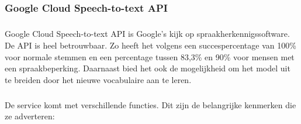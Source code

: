 \chapter{} \label{chap:Long list}%
\label{ch:long-list}

\section{}\label{sec:Speech recognition}%

\subsection{Google Cloud Speech-to-text API}%

\paragraph{}
Google Cloud Speech-to-text API is Google's kijk op spraakherkennigssoftware. De API is heel betrouwbaar. Zo heeft het volgens \textcite{Anggraini2018} een succespercentage van 100\% voor normale stemmen en een percentage tussen 83,3\% en 90\% voor mensen met een spraakbeperking. Daarnaast bied het ook de mogelijkheid om het model uit te breiden door het nieuwe vocabulaire aan te leren.

\paragraph{}
De service komt met verschillende functies. Dit zijn de belangrijke kenmerken die ze adverteren:

